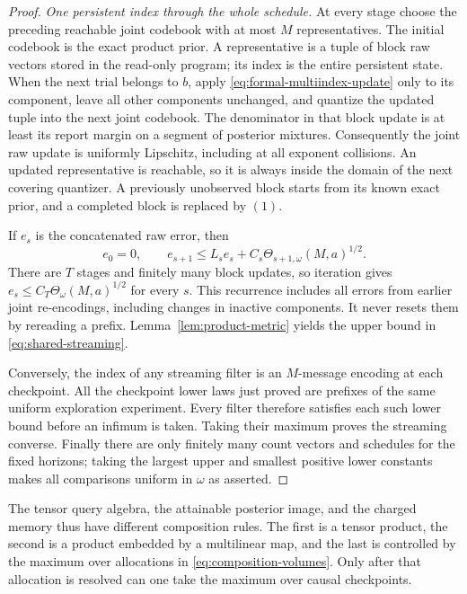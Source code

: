 \begin{proof}
\emph{One persistent index through the whole schedule.}
At every stage choose the preceding reachable joint codebook with at most
$M$ representatives. The initial codebook is the exact product prior.
A representative is a tuple of block raw vectors stored in the read-only
program; its index is the entire persistent state. When the next trial
belongs to $b$, apply \eqref{eq:formal-multiindex-update} only to its
component, leave all other components unchanged, and quantize the updated
tuple into the next joint codebook. The denominator in that block update
is at least its report margin on a segment of posterior mixtures.
Consequently the joint raw update is uniformly Lipschitz, including at
all exponent collisions. An updated representative is reachable, so it
is always inside the domain of the next covering quantizer. A previously
unobserved block starts from its known exact prior, and a completed block
is replaced by $(1)$.

If $e_s$ is the concatenated raw error, then
\[
 e_0=0,\qquad e_{s+1}\le L_s e_s+
       C_s\Theta_{s+1,\omega}(M,a)^{1/2}.
\]
There are $T$ stages and finitely many block updates, so iteration gives
$e_s\le C_T\Theta_\omega(M,a)^{1/2}$ for every $s$.
This recurrence includes all errors from earlier joint re-encodings,
including changes in inactive components. It never resets them by
rereading a prefix. Lemma~\ref{lem:product-metric} yields the upper
bound in \eqref{eq:shared-streaming}.

Conversely, the index of any streaming filter is an $M$-message encoding
at each checkpoint. All the checkpoint lower laws just proved are
prefixes of the same uniform exploration experiment. Every filter
therefore satisfies each such lower bound before an infimum is taken.
Taking their maximum proves the streaming converse. Finally there are
only finitely many count vectors and schedules for the fixed horizons;
taking the largest upper and smallest positive lower constants makes
all comparisons uniform in $\omega$ as asserted.
\end{proof}

The tensor query algebra, the attainable posterior image, and the charged
memory thus have different composition rules. The first is a tensor
product, the second is a product embedded by a multilinear map, and the
last is controlled by the maximum over allocations in
\eqref{eq:composition-volumes}. Only after that allocation is resolved
can one take the maximum over causal checkpoints.
